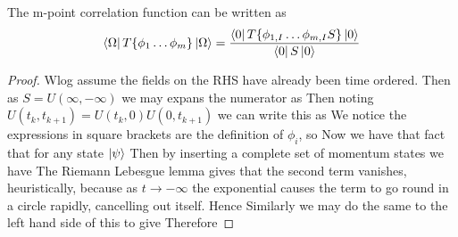 \documentclass{article}
\begin{document}
\begin{theorem}
The m-point correlation function can be written as 
\[
\bra{\Omega} T\{ \phi_1 \dots \phi_m \} \ket{\Omega} = \frac{\bra{0} T\{\phi_{1,I} \dots \phi_{m,I} S \} \ket{0}}{\bra{0} S \ket{0}}
\]
\end{theorem}
\begin{proof}
Wlog assume the fields on the RHS have already been time ordered. Then as $S = U(\infty,-\infty)$ we may expans the numerator as 
Then noting $U(t_k,t_{k+1}) = U(t_k,0)U(0,t_{k+1})$ we can write this as 
We notice the expressions in square brackets are the definition of $\phi_i$, so 
Now we have that fact that for any state $\ket{\psi}$ 
Then by inserting a complete set of momentum states we have 
The Riemann Lebesgue lemma gives that the second term vanishes, heuristically, because as $t \to -\infty$ the exponential causes the term to go round in a circle rapidly, cancelling out itself. Hence 
Similarly we may do the same to the left hand side of this to give 
Therefore 
\end{proof}
\end{document}
